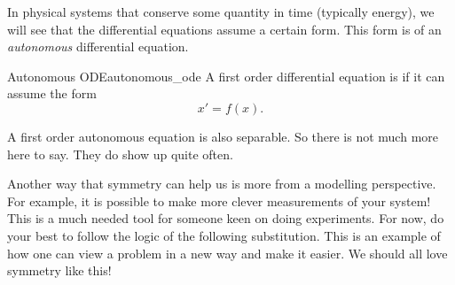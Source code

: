         \newpage
        
        In physical systems that conserve some quantity in time (typically energy), we will see that the differential equations assume a certain form.  This form is of an \emph{autonomous} differential equation.
        
        \begin{df}{Autonomous ODE}{autonomous_ode}
            A first order differential equation is  if it can assume the form
            \[
            x'=f(x).
            \]
        \end{df}
        \noindent A first order autonomous equation is also separable. So there is not much more here to say.  They do show up quite often.
        
        Another way that symmetry can help us is more from a modelling perspective. For example, it is possible to make more clever measurements of your system! This is a much needed tool for someone keen on doing experiments. For now, do your best to follow the logic of the following substitution.  This is an example of how one can view a problem in a new way and make it easier.  We should all love symmetry like this! 
        
